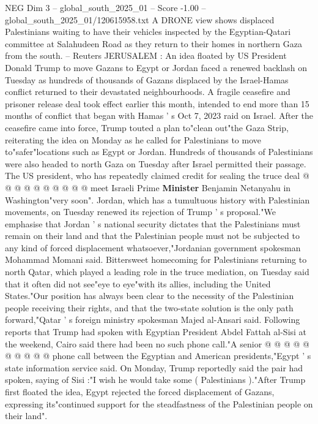\begin{textsample}{NEG Dim 3 – global\_south\_2025\_01 – Score -1.00 – global\_south\_2025\_01/120615958.txt}  \label{ex:f3_neg_058}
A DRONE view shows displaced Palestinians waiting to have their vehicles inspected by the Egyptian-Qatari committee at Salahudeen Road as they return to their homes in northern Gaza from the south. -- Reuters JERUSALEM : An idea floated by US President Donald Trump to move Gazans to Egypt or Jordan faced a renewed backlash on Tuesday as hundreds of thousands of Gazans displaced by the Israel-Hamas conflict returned to their devastated neighbourhoods.
A fragile ceasefire and prisoner release deal took effect earlier this month, intended to end more than 15 months of conflict that began with Hamas ' s Oct 7, 2023 raid on Israel.
After the ceasefire came into force, Trump touted a plan to"clean out"the Gaza Strip, reiterating the idea on Monday as he called for Palestinians to move to"safer"locations such as Egypt or Jordan.
Hundreds of thousands of Palestinians were also headed to north Gaza on Tuesday after Israel permitted their passage.
The US president, who has repeatedly claimed credit for sealing the truce deal @ @ @ @ @ @ @ @ @ @ meet Israeli Prime \textbf{Minister} Benjamin Netanyahu in Washington"very soon".
Jordan, which has a tumultuous history with Palestinian movements, on Tuesday renewed its rejection of Trump ' s proposal."We emphasise that Jordan ' s national security dictates that the Palestinians must remain on their land and that the Palestinian people must not be subjected to any kind of forced displacement whatsoever,"Jordanian government spokesman Mohammad Momani said.
Bittersweet homecoming for Palestinians returning to north Qatar, which played a leading role in the truce mediation, on Tuesday said that it often did not see"eye to eye"with its allies, including the United States."Our position has always been clear to the necessity of the Palestinian people receiving their rights, and that the two-state solution is the only path forward,"Qatar ' s foreign ministry spokesman Majed al-Ansari said.
Following reports that Trump had spoken with Egyptian President Abdel Fattah al-Sisi at the weekend, Cairo said there had been no such phone call."A senior @ @ @ @ @ @ @ @ @ @ phone call between the Egyptian and American presidents,"Egypt ' s state information service said.
On Monday, Trump reportedly said the pair had spoken, saying of Sisi :"I wish he would take some ( Palestinians )."After Trump first floated the idea, Egypt rejected the forced displacement of Gazans, expressing its"continued support for the steadfastness of the Palestinian people on their land".

\end{textsample}
